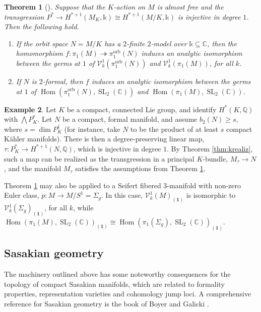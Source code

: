 \documentclass{article}
\numberwithin{equation}{section}
\newtheorem{theorem}{Theorem}[section]
\theoremstyle{definition}
\newtheorem{example}[theorem]{Example}
\newcommand{\Q}{\mathbb{Q}}
\renewcommand{\C}{\mathbb{C}}
\renewcommand{\k}{\mathbb{k}}
\newcommand{\VV}{\mathcal{V}}
\DeclareMathOperator{\SL}{SL}
\DeclareMathOperator{\Hom}{{Hom}}
\DeclareMathOperator{\orb}{orb}
\newcommand{\surj}{\twoheadrightarrow}
\newcommand{\one}{\mathbf{1}}
\begin{document}
\begin{theorem}[\cite{PS-imrn19}]
\label{thm:monotr}
Suppose that the $K$-action on $M$ is almost free and  the transgression 
$P^{*} \to H^{* +1}(M_K,\k) \cong H^{* +1}(M/K,\k)$ is injective in degree $1$.
Then the following hold.
\begin{enumerate}
\item \label{mn1}
If the orbit space $N=M/K$ has a $2$-finite $2$-model over $\k \subseteq \C$,
then the homomorphism $f\colon \pi_1 (M) \surj \pi_1^{\orb} (N)$ 
induces an analytic isomorphism between the germs at $1$ of 
$\VV^1_k(\pi_1^{\orb} (N))$ and $\VV^1_k (\pi_1 (M))$, 
for all $k$.
\item \label{mn2}
If $N$ is $2$-formal, then $f$ induces an analytic isomorphism between the 
germs at $1$ of $\Hom (\pi_1^{\orb} (N), \SL_2 (\C))$ and $\Hom (\pi_1 (M), \SL_2 (\C))$.
\end{enumerate}
\end{theorem}

\begin{example}
\label{ex:tauinj}
Let $K$ be a compact, connected Lie group, and identify 
$H^{*}(K,\Q)$ with $\bigwedge P^{*}_K$. Let $N$ be a 
compact, formal manifold, and assume $b_2(N)\ge s$, 
where $s=\dim P^1_K$  (for instance, take $N$ to be the 
product of at least $s$ compact K\"{a}hler manifolds). 
There is then a degree-preserving 
linear map, $\tau \colon P^{*}_K \to H^{* +1}(N,\Q)$, which is  
injective in degree $1$.  By Theorem \ref{thm:krealiz}, such a map 
can be realized as the transgression in a principal $K$-bundle, $M_{\tau}\to N$,  
and the manifold $M_{\tau}$ satisfies the assumptions from Theorem \ref{thm:monotr}. 
\end{example}

Theorem \ref{thm:monotr} may also be applied to a Seifert fibered $3$-manifold 
with non-zero Euler class, $p\colon M \to M/S^1 =\Sigma_g$. In this case, 
$\VV^1_k (M)_{(\one)}$ is isomorphic to $\VV^1_k (\Sigma_g)_{(\one)}$, 
for all $k$, while $\Hom (\pi_1 (M), \SL_2 (\C))_{(\one)}\cong 
\Hom (\pi_1 (\Sigma_g), \SL_2 (\C))_{(\one)}$.

\subsection{Sasakian geometry}
\label{subsec:sas}
The machinery outlined above has some noteworthy  
consequences for the topology of compact Sasakian manifolds, 
which are related to formality properties, representation varieties and 
cohomology jump loci. A comprehensive reference for Sasakian 
geometry is the book of Boyer and Galicki \cite{BG}.  
\end{document}
